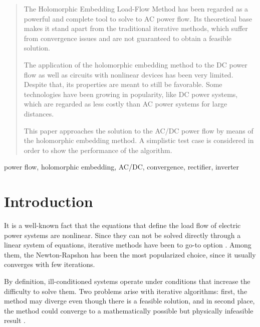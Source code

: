 \documentclass[conference]{IEEEtran}
\begin{document}
\begin{abstract}
The Holomorphic Embedding Load-Flow Method has been regarded as a powerful and complete tool to solve to AC power flow. Its theoretical base makes it stand apart from the traditional iterative methods, which suffer from convergence issues and are not guaranteed to obtain a feasible solution. 

The application of the holomorphic embedding method to the DC power flow as well as circuits with nonlinear devices has been very limited. Despite that, its properties are meant to still be favorable. Some technologies have been growing in popularity, like DC power systems, which are regarded as less costly than AC power systems for large distances. 

This paper approaches the solution to the AC/DC power flow by means of the holomorphic embedding method. A simplistic test case is considered in order to show the performance of the algorithm. 
\end{abstract}
\begin{IEEEkeywords}
power flow, holomorphic embedding, AC/DC, convergence, rectifier, inverter
\end{IEEEkeywords}  





%
\IEEEpeerreviewmaketitle

\section{Introduction}\label{secIntro}
It is a well-known fact that the equations that define the load flow of electric power systems are nonlinear. Since they can not be solved directly through a linear system of equations, iterative methods have been to go-to option \cite{Gomez}. Among them, the Newton-Rapshon has been the most popularized choice, since it usually converges with few iterations. 

By definition, ill-conditioned systems operate under conditions that increase the difficulty to solve them. Two problems arise with iterative algorithms: first, the method may diverge even though there is a feasible solution, and in second place, the method could converge to a mathematically possible but physically infeasible result \cite{Tripathy}.
\end{document}
